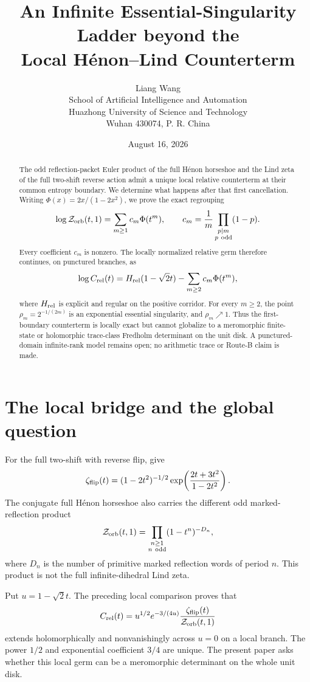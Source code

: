 \documentclass[11pt]{article}
\title{An Infinite Essential-Singularity Ladder beyond the\\Local H\'enon--Lind Counterterm}
\author{Liang Wang\\\small School of Artificial Intelligence and Automation\\\small Huazhong University of Science and Technology\\\small Wuhan 430074, P. R. China}
\date{August 16, 2026}
\newcommand{\Zorb}{\mathcal Z_{\rm orb}}
\newcommand{\zflip}{\zeta_{\rm flip}}
\begin{document}
\maketitle

\begin{abstract}
The odd reflection-packet Euler product of the full H\'enon horseshoe and
the Lind zeta of the full two-shift reverse action admit a unique local
relative counterterm at their common entropy boundary.  We determine what
happens after that first cancellation.  Writing
\(\Phi(x)=2x/(1-2x^2)\), we prove the exact regrouping
\[
 \log\Zorb(t,1)=\sum_{m\ge1}c_m\Phi(t^m),\qquad
 c_m=\frac1m\prod_{\substack{p\mid m\\p\ {\rm odd}}}(1-p).
\]
Every coefficient $c_m$ is nonzero.  The locally normalized relative germ
therefore continues, on punctured branches, as
\[
 \log C_{\rm rel}(t)=H_{\rm rel}(1-\sqrt2t)
 -\sum_{m\ge2}c_m\Phi(t^m),
\]
where $H_{\rm rel}$ is explicit and regular on the positive corridor.  For
every $m\ge2$, the point $\rho_m=2^{-1/(2m)}$ is an exponential essential
singularity, and $\rho_m\nearrow1$.  Thus the first-boundary counterterm is
locally exact but cannot globalize to a meromorphic finite-state or
holomorphic trace-class Fredholm determinant on the unit disk.  A
punctured-domain infinite-rank model remains open; no arithmetic trace or
Route-B claim is made.
\end{abstract}

\section{The local bridge and the global question}

For the full two-shift with reverse flip, \citet[Example~4.3]{KimLeePark2003}
give
\begin{equation}\label{eq:lind}
 \zflip(t)=(1-2t^2)^{-1/2}
 \exp\!\left(\frac{2t+3t^2}{1-2t^2}\right).
\end{equation}
The conjugate full H\'enon horseshoe \cite{DevaneyNitecki1979} also carries
the different odd marked-reflection product
\begin{equation}\label{eq:packet-product}
 \Zorb(t,1)=\prod_{\substack{n\ge1\\n\ {\rm odd}}}(1-t^n)^{-D_n},
\end{equation}
where $D_n$ is the number of primitive marked reflection words of period
$n$.  This product is not the full infinite-dihedral Lind zeta.

Put $u=1-\sqrt2t$.  The preceding local comparison proves that
\begin{equation}\label{eq:counterterm}
 C_{\rm rel}(t)=u^{1/2}e^{-3/(4u)}
 \frac{\zflip(t)}{\Zorb(t,1)}
\end{equation}
extends holomorphically and nonvanishingly across $u=0$ on a local branch.
The power $1/2$ and exponential coefficient $3/4$ are unique.  The present
paper asks whether this local germ can be a meromorphic determinant on the
whole unit disk.
\end{document}
